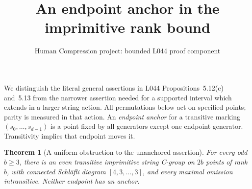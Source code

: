 \documentclass[11pt,a4paper]{article}
\title{An endpoint anchor in the imprimitive rank bound}
\author{Human Compression project: bounded L044 proof component}
\date{}
\newtheorem{theorem}{Theorem}
\begin{document}
\maketitle
We distinguish the literal general assertions in L044
Propositions~5.12(c) and~5.13 from the narrower assertion needed
for a supported interval which extends in a larger string action.
All permutations below act on specified points; parity is measured
in that action. An \emph{endpoint anchor} for a transitive marking
$(s_0,\ldots,s_{d-1})$ is a point fixed by all generators except
one endpoint generator. Transitivity implies that endpoint moves it.

\begin{theorem}[A uniform obstruction to the unanchored assertion]
For every odd $b\geq3$, there is an even transitive imprimitive
string C-group on $2b$ points of rank $b$, with connected
Schl\"afli diagram $[4,3,\ldots,3]$, and every maximal omission
intransitive. Neither endpoint has an anchor.
\end{theorem}
\end{document}
